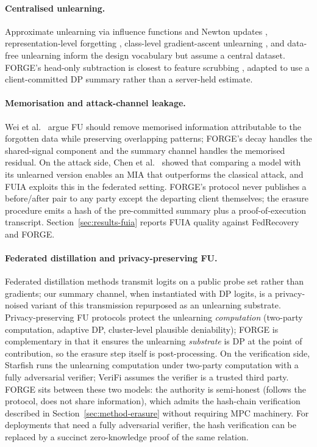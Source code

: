 \paragraph{Centralised unlearning.}
Approximate unlearning via influence functions and Newton updates
\cite{izzo2021approximate,mehta2022deep}, representation-level forgetting
\cite{golatkar2020eternal,golatkar2021mixed,tarun2023fast}, class-level gradient-ascent
unlearning \cite{tarun2023fast,chundawat2023badteacher}, and data-free unlearning
\cite{chundawat2023zeroshot} inform the design vocabulary but assume a central dataset.
FORGE's head-only subtraction is closest to feature scrubbing
\cite{golatkar2020eternal}, adapted to use a client-committed DP summary rather than a
server-held estimate.

\paragraph{Memorisation and attack-channel leakage.}
Wei et al.\ \cite{wei2026fedmemprune} argue FU should remove memorised information
attributable to the forgotten data while preserving overlapping patterns; FORGE's
decay handles the shared-signal component and the summary channel handles the
memorised residual. On the attack side, Chen et al.\ \cite{chen2021unlearningleaks}
showed that comparing a model with its unlearned version enables an MIA that
outperforms the classical attack, and FUIA \cite{fuia2025} exploits this in the
federated setting. FORGE's protocol never publishes a before/after pair to any party
except the departing client themselves; the erasure procedure emits a hash of the
pre-committed summary plus a proof-of-execution transcript. Section~\ref{sec:results-fuia}
reports FUIA quality against FedRecovery and FORGE.

\paragraph{Federated distillation and privacy-preserving FU.}
Federated distillation methods \cite{li2019fedmd,he2020fedgkt,lin2020feddf} transmit
logits on a public probe set rather than gradients; our summary channel, when
instantiated with DP logits, is a privacy-noised variant of this transmission
repurposed as an unlearning substrate. Privacy-preserving FU protocols
\cite{starfish2024,fedadp2024,varshney2025plausible} protect the unlearning
\emph{computation} (two-party computation, adaptive DP, cluster-level plausible
deniability); FORGE is complementary in that it ensures the unlearning
\emph{substrate} is DP at the point of contribution, so the erasure step itself is
post-processing. On the verification side, Starfish \cite{starfish2024} runs the
unlearning computation under two-party computation with a fully adversarial
verifier; VeriFi \cite{gao2022verifi} assumes the verifier is a trusted third
party. FORGE sits between these two models: the authority is semi-honest (follows
the protocol, does not share information), which admits the hash-chain
verification described in Section~\ref{sec:method-erasure} without requiring MPC
machinery. For deployments that need a fully adversarial verifier, the hash
verification can be replaced by a succinct zero-knowledge proof of the same
relation.

